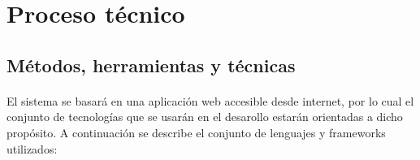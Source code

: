 \documentclass{article}
\begin{document}
	\clearpage
  	\section{Proceso técnico}


       	\subsection{Métodos, herramientas y técnicas}
            
            \paragraph{}
			El sistema se basará en una aplicación web accesible desde internet, por lo cual el conjunto de tecnologías que se usarán en el desarollo estarán orientadas a dicho propósito. A continuación se describe el conjunto de lenguajes y frameworks utilizados:
            
\end{document}
